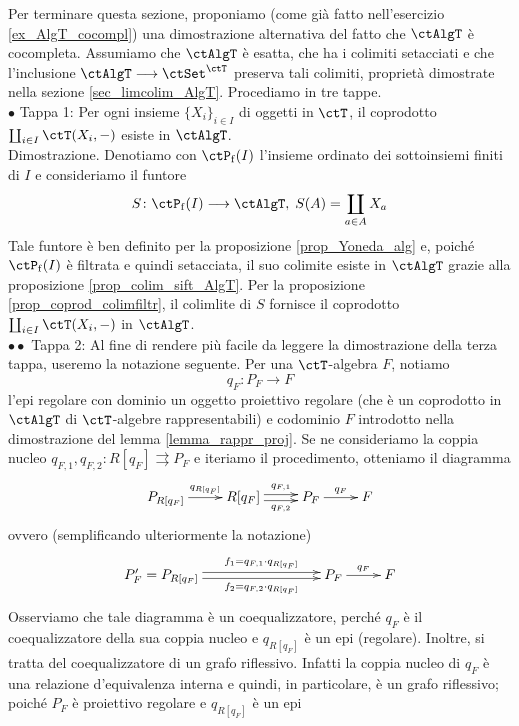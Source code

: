 \begin{exercise}\label{ex_algt_cocmpl_proj}
 Per terminare questa sezione, proponiamo (come già fatto nell'esercizio \ref{ex_AlgT_cocompl}) una dimostrazione alternativa
 del fatto che \(\ctAlgT\) è cocompleta. Assumiamo che \(\ctAlgT\) è esatta, che ha i colimiti setacciati e che l'inclusione
 \(\ctAlgT \fun \ctSet^{\ctT}\) preserva tali colimiti, proprietà dimostrate nella sezione \ref{sec_limcolim_AlgT}. Procediamo in tre tappe. \\
 \(\bullet\) Tappa 1:
 Per ogni insieme \(\{X_i \}_{i \in I}\) di oggetti in \(\ctT\), il coprodotto \(\cop_{i \in I}\ctT(X_i,-)\) esiste in \(\ctAlgT\). \\
 Dimostrazione.
 Denotiamo con \(\ctP_{\mathrm{f}}(I)\) l'insieme ordinato dei sottoinsiemi finiti di \(I\) e consideriamo il funtore
 \[ S \colon \ctP_{\mathrm{f}}(I) \fun \ctAlgT, \; S(A) = \cop_{a \in A}X_a \]
 Tale funtore è ben definito per la proposizione \ref{prop_Yoneda_alg} e, poiché \(\ctP_{\mathrm{f}}(I)\) è filtrata e quindi
 setacciata, il suo colimite esiste in \(\ctAlgT\) grazie alla proposizione \ref{prop_colim_sift_AlgT}. Per la proposizione
 \ref{prop_coprod_colimfiltr}, il colimlite di \(S\) fornisce il coprodotto \(\cop_{i \in I}\ctT(X_i,-)\) in \(\ctAlgT\). \\
 \(\bullet\bullet\) Tappa 2:
 Al fine di rendere più facile da leggere la dimostrazione della terza tappa, useremo la notazione seguente.
 Per una \(\ctT\)-algebra \(F\), notiamo
 \[q_F \colon P_F \to F\]
 l'epi regolare con dominio un oggetto proiettivo regolare (che è un coprodotto in \(\ctAlgT\) di \(\ctT\)-algebre rappresentabili)
 e codominio \(F\) introdotto nella dimostrazione del lemma \ref{lemma_rappr_proj}. Se ne consideriamo la coppia nucleo
 \(q_{F,1},q_{F,2} \colon R[q_F] \rightrightarrows P_F\) e iteriamo il procedimento, otteniamo il diagramma
 \[\xymatrix{P_{R[q_F]} \ar[r]^-{q_{R[q_F]}} & R[q_F] \ar@<0.5ex>[r]^-{q_{F,1}} \ar@<-0.5ex>[r]_-{q_{F,2}} & P_F \ar[r]^-{q_F} & F}\]
 ovvero (semplificando ulteriormente la notazione)
 \[\xymatrix{P'_F = P_{R[q_F]} \ar@<0.5ex>[rrr]^-{f_1 = q_{F,1} \cdot q_{R[q_F]}} \ar@<-0.5ex>[rrr]_-{f_2 = q_{F,2} \cdot q_{R[q_F]}}
  & & & P_F \ar[r]^-{q_F} & F}\]
 Osserviamo che tale diagramma è un coequalizzatore, perché \(q_F\) è il coequalizzatore della sua coppia nucleo e \(q_{R[q_F]}\)
 è un epi (regolare). Inoltre, si tratta del coequalizzatore di un grafo riflessivo. Infatti la coppia nucleo di \(q_F\) è una relazione
 d'equivalenza interna e quindi, in particolare, è un grafo riflessivo; poiché \(P_F\) è proiettivo regolare e \(q_{R[q_F]}\) è un epi

\end{exercise}
